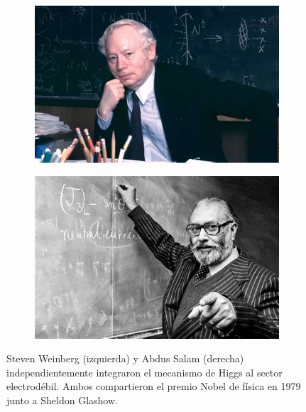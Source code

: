 \documentclass[12pt,a4paper]{report}
\begin{document}
\begin{figure}
\begin{subfigure}{0.5\textwidth}
	\includegraphics[scale=0.5]{images/weinberg.jpeg}
\end{subfigure}	
\begin{subfigure}{0.5\textwidth}
	\includegraphics[scale=0.5]{images/salam.jpeg}
\end{subfigure}	
\caption{Steven Weinberg (izquierda) y Abdus Salam (derecha) independientemente integraron el mecanismo de Higgs al sector electrod\'ebil. Ambos compartieron el premio Nobel de f\'isica en 1979 junto a Sheldon Glashow.}
\end{figure}
\end{document}
